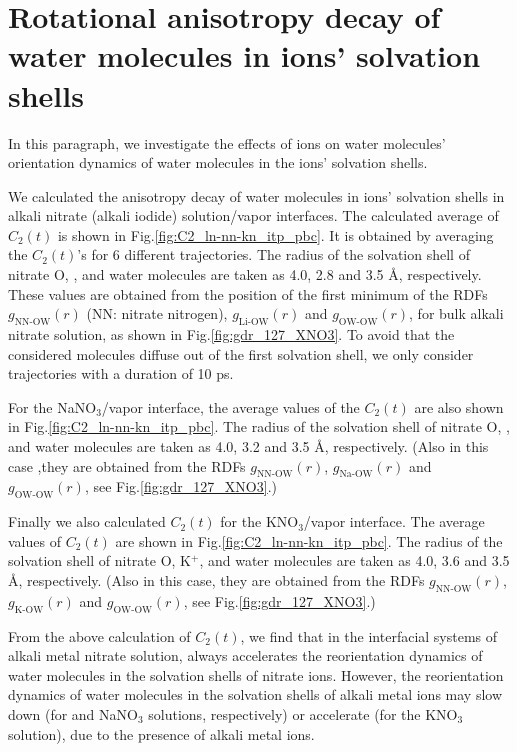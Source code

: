 \FloatBarrier
\section{Rotational anisotropy decay of water molecules in ions' solvation shells}\label{RAD_SHELL}
In this paragraph, we investigate the effects of ions on  water molecules' orientation dynamics of water molecules in the ions' solvation shells. 

We calculated the anisotropy decay of water molecules in ions' solvation shells in alkali nitrate (alkali iodide) solution/vapor interfaces. 
The calculated average of $C_2(t)$ is shown in Fig.\thinspace\ref{fig:C2_ln-nn-kn_itp_pbc}. 
It is obtained by averaging the $C_2(t)$'s for 6 different trajectories.
The radius of the solvation shell of nitrate O, \Li, and water molecules are taken as 4.0, 2.8 and 3.5 \AA, respectively. 
These values are obtained from the position of the first minimum of the RDFs $g_{\text{NN-OW}}(r)$ (NN: nitrate nitrogen), $g_{\text{Li-OW}}(r)$ and $g_{\text{OW-OW}}(r)$,
for bulk alkali nitrate solution, as shown in Fig.\thinspace\ref{fig:gdr_127_XNO3}. 
To avoid that the considered molecules diffuse out of the first solvation shell, we only consider trajectories with a duration of 10 ps. 

For the NaNO$_3$/vapor interface, the average values of the $C_2(t)$ are also shown in 
Fig.\thinspace\ref{fig:C2_ln-nn-kn_itp_pbc}. 
The radius of the solvation shell of nitrate O, \Na, and water molecules are taken as 4.0, 3.2 and 3.5 \AA, respectively. 
(Also in this case ,they are obtained from the RDFs $g_{\text{NN-OW}}(r)$, $g_{\text{Na-OW}}(r)$ and $g_{\text{OW-OW}}(r)$,
see Fig.\thinspace\ref{fig:gdr_127_XNO3}.) 

Finally we also calculated $C_2(t)$ for the KNO$_3$/vapor interface. 
The average values of $C_2(t)$ are shown in Fig.\thinspace\ref{fig:C2_ln-nn-kn_itp_pbc}.
The radius of the solvation shell of nitrate O, K$^+$, and water molecules are taken as 4.0, 3.6 and 3.5 \AA, respectively. 
(Also in this case, they are obtained from the RDFs $g_{\text{NN-OW}}(r)$, $g_{\text{K-OW}}(r)$ and $g_{\text{OW-OW}}(r)$,
see Fig.\thinspace\ref{fig:gdr_127_XNO3}.) 

From the above calculation of $C_2(t)$, we find that in the interfacial systems of alkali metal nitrate solution, 
\nitrate always accelerates the reorientation dynamics of water molecules in the solvation shells of nitrate ions.
However, the reorientation dynamics of water molecules in the solvation shells of alkali metal ions may slow down 
(for \LiN and NaNO$_3$ solutions, respectively) or accelerate (for the KNO$_3$ solution), 
due to the presence of alkali metal ions. 

